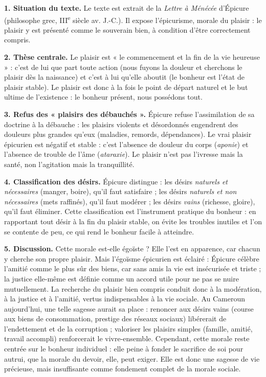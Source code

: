 \documentclass[11pt]{article}
\begin{document}
\begin{corrige}
\textbf{1. Situation du texte.} Le texte est extrait de la \emph{Lettre à Ménécée} d'Épicure (philosophe grec, III\textsuperscript{e} siècle av. J.-C.). Il expose l'épicurisme, morale du plaisir : le plaisir y est présenté comme le souverain bien, à condition d'être correctement compris.

\textbf{2. Thèse centrale.} Le plaisir est « le commencement et la fin de la vie heureuse » : c'est de lui que part toute action (nous fuyons la douleur et cherchons le plaisir dès la naissance) et c'est à lui qu'elle aboutit (le bonheur est l'état de plaisir stable). Le plaisir est donc à la fois le point de départ naturel et le but ultime de l'existence : le bonheur présent, nous possédons tout.

\textbf{3. Refus des « plaisirs des débauchés ».} Épicure refuse l'assimilation de sa doctrine à la débauche : les plaisirs violents et désordonnés engendrent des douleurs plus grandes qu'eux (maladies, remords, dépendances). Le vrai plaisir épicurien est négatif et stable : c'est l'absence de douleur du corps (\emph{aponie}) et l'absence de trouble de l'âme (\emph{ataraxie}). Le plaisir n'est pas l'ivresse mais la santé, non l'agitation mais la tranquillité.

\textbf{4. Classification des désirs.} Épicure distingue : les désirs \emph{naturels et nécessaires} (manger, boire), qu'il faut satisfaire ; les désirs \emph{naturels et non nécessaires} (mets raffinés), qu'il faut modérer ; les désirs \emph{vains} (richesse, gloire), qu'il faut éliminer. Cette classification est l'instrument pratique du bonheur : en rapportant tout désir à la fin du plaisir stable, on évite les troubles inutiles et l'on se contente de peu, ce qui rend le bonheur facile à atteindre.

\textbf{5. Discussion.} Cette morale est-elle égoïste ? Elle l'est en apparence, car chacun y cherche son propre plaisir. Mais l'égoïsme épicurien est éclairé : Épicure célèbre l'amitié comme le plus sûr des biens, car sans amis la vie est insécurisée et triste ; la justice elle-même est définie comme un accord utile pour ne pas se nuire mutuellement. La recherche du plaisir bien compris conduit donc à la modération, à la justice et à l'amitié, vertus indispensables à la vie sociale. Au Cameroun aujourd'hui, une telle sagesse aurait sa place : renoncer aux désirs vains (course aux biens de consommation, prestige des réseaux sociaux) libérerait de l'endettement et de la corruption ; valoriser les plaisirs simples (famille, amitié, travail accompli) renforcerait le vivre-ensemble. Cependant, cette morale reste centrée sur le bonheur individuel : elle peine à fonder le sacrifice de soi pour autrui, que la morale du devoir, elle, peut exiger. Elle est donc une sagesse de vie précieuse, mais insuffisante comme fondement complet de la morale sociale.


\end{corrige}
\end{document}

